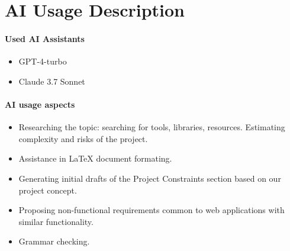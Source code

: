 \section{AI Usage Description}

\paragraph{Used AI Assistants}

\begin{itemize}
    \item GPT-4-turbo
    \item Claude 3.7 Sonnet
\end{itemize}

\paragraph{AI usage aspects}

\begin{itemize}

    \item Researching the topic: searching for tools, libraries, resources. Estimating complexity and risks of the project.
    \item Assistance in LaTeX document formating.
    \item Generating initial drafts of the Project Constraints section based
    on our project concept.
    \item Proposing non-functional requirements common to web applications with
    similar functionality.
    \item Grammar checking.

\end{itemize}



